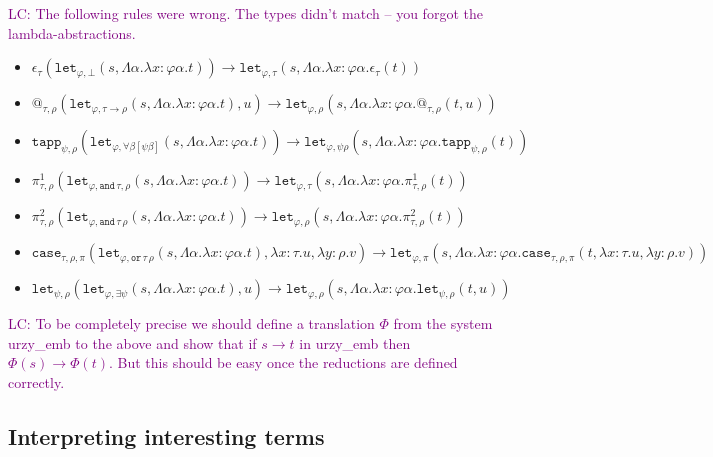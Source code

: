 \documentclass[runningheads,a4paper]{llncs}
\newcommand{\red}{\longrightarrow}
\newcommand{\arrtype}{\rightarrow}
\newcommand{\abs}[2]{\lambda #1.#2}
\newcommand{\tabs}[2]{\Lambda #1.#2}
\newcommand{\LC}[1]{\textcolor{purple}{LC: #1}}
\begin{document}
\LC{The following rules were wrong. The types didn't match -- you
  forgot the lambda-abstractions.}
\begin{itemize}
\item
  $\epsilon_\tau(\mathtt{let}_{\varphi,\bot}(s,\tabs{\alpha}{\abs{x:\varphi\alpha}{t}}))
  \red
  \mathtt{let}_{\varphi,\tau}(s,\tabs{\alpha}{\abs{x:\varphi\alpha}{\epsilon_\tau(t)}})$
\item $@_{\tau,\rho}(\mathtt{let}_{\varphi, \tau \arrtype
  \rho}(s,\tabs{\alpha}{\abs{x:\varphi\alpha}{t}}),u) \red
  \mathtt{let}_{\varphi,\rho}(s,\tabs{\alpha}{\abs{x:\varphi\alpha}{@_{\tau,\rho}(t,
      u)}})$
\item
  $\mathtt{tapp}_{\psi,\rho}(\mathtt{let}_{\varphi,\forall\beta[\psi\beta]}(s,\tabs{\alpha}{\abs{x:\varphi\alpha}{t}}))
  \red
  \mathtt{let}_{\varphi,\psi\rho}(s,\tabs{\alpha}{\abs{x:\varphi\alpha}{\mathtt{tapp}_{\psi,\rho}(t)}})$
\item
  $\pi^1_{\tau,\rho}(\mathtt{let}_{\varphi,
  \mathtt{and}\,\tau,\rho}(s,\tabs{\alpha}{\abs{x:\varphi\alpha}{t}}))
  \red
  \mathtt{let}_{\varphi,\tau}(s,\tabs{\alpha}{\abs{x:\varphi\alpha}{\pi^1_{\tau,
        \rho}(t)}})$
\item
  $\pi^2_{\tau,\rho}(\mathtt{let}_{\varphi,
  \mathtt{and}\,\tau\,\rho}(s,\tabs{\alpha}{\abs{x:\varphi\alpha}{t}}))
  \red
  \mathtt{let}_{\varphi,\rho}(s,\tabs{\alpha}{\abs{x:\varphi\alpha}{\pi^2_{\tau,\rho}(t)}})$
\item $\mathtt{case}_{\tau,\rho,\pi}(
  \mathtt{let}_{\varphi,\mathtt{or}\,\tau\,\rho}(s,\tabs{\alpha}{\abs{x:\varphi\alpha}{t}}),\abs{x:\tau}{u},\abs{y:\rho}{v})
  \red
  \mathtt{let}_{\varphi,\pi}(s,\tabs{\alpha}{\abs{x:\varphi\alpha}{\mathtt{case}_{\tau,\rho,\pi}(t,\abs{x:\tau}{u},\abs{y:\rho}{v})}})$
\item
  $\mathtt{let}_{\psi,\rho}(\mathtt{let}_{\varphi,\exists\psi}(s,\tabs{\alpha}{\abs{x:\varphi\alpha}{t}}),u)
  \red
  \mathtt{let}_{\varphi,\rho}(s,\tabs{\alpha}{\abs{x:\varphi\alpha}{\mathtt{let}_{\psi,\rho}(t,u)}})$
\end{itemize}

\LC{To be completely precise we should define a translation $\Phi$
  from the system urzy\_emb to the above and show that if $s \red t$
  in urzy\_emb then $\Phi(s) \red \Phi(t)$. But this should be easy
  once the reductions are defined correctly.}

\subsection{Interpreting interesting terms}
\end{document}
